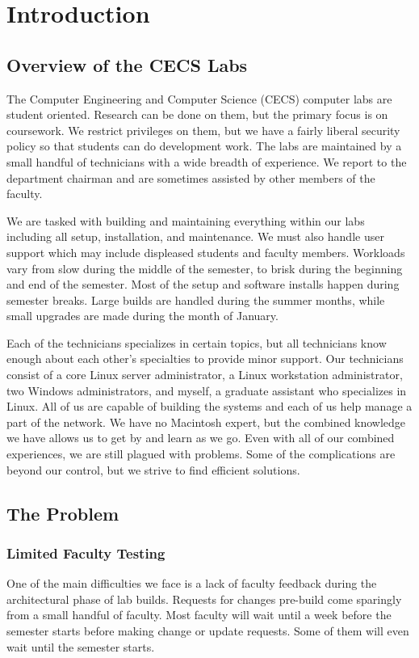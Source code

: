 \chapter{Introduction} \label{ch:introduction}
\section{Overview of the CECS Labs}

The Computer Engineering and Computer Science (CECS) computer labs are student oriented.  Research can be done on them, but the primary focus is on coursework.  We restrict privileges on them, but we have a fairly liberal security policy so that students can do development work.  The labs are maintained by a small handful of technicians with a wide breadth of experience.  We report to the department chairman and are sometimes assisted by other members of the faculty. 

We are tasked with building and maintaining everything within our labs including all setup, installation, and maintenance.  We must also handle user support which may include displeased students and faculty members.  Workloads vary from slow during the middle of the semester, to brisk during the beginning and end of the semester.  Most of the setup and software installs happen during semester breaks.  Large builds are handled during the summer months, while small upgrades are made during the month of January. 

Each of the technicians specializes in certain topics, but all technicians know enough about each other’s specialties to provide minor support.  Our technicians consist of a core Linux server administrator, a Linux workstation administrator, two Windows administrators, and myself, a graduate assistant who specializes in Linux.  All of us are capable of building the systems and each of us help manage a part of the network.  We have no Macintosh expert, but the combined knowledge we have allows us to get by and learn as we go.  Even with all of our combined experiences, we are still plagued with problems.  Some of the complications are beyond our control, but we strive to find efficient solutions. 

\section{The Problem} \label{sec:the_problem}
\subsection{Limited Faculty Testing}
One of the main difficulties we face is a lack of faculty feedback during the architectural phase of lab builds.  Requests for changes pre-build come sparingly from a small handful of faculty.  Most faculty will wait until a week before the semester starts before making change or update requests.  Some of them will even wait until the semester starts.

